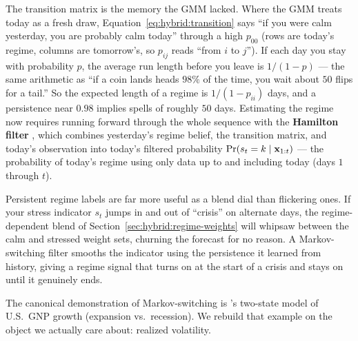 \begin{intuition}
The transition matrix is the memory the GMM lacked.  Where the GMM treats
today as a fresh draw, Equation~\eqref{eq:hybrid:transition} says ``if you
were calm yesterday, you are probably calm today'' through a high $p_{00}$
(rows are today's regime, columns are tomorrow's, so $p_{ij}$ reads ``from
$i$ to $j$'').  If each day you stay with probability $p$, the average run
length before you leave is $1/(1-p)$ --- the same arithmetic as ``if a coin
lands heads $98\%$ of the time, you wait about $50$ flips for a tail.''  So
the expected length of a regime is $1/(1-p_{ii})$ days, and a persistence
near $0.98$ implies spells of roughly $50$ days.  Estimating the
regime now requires running forward through the whole sequence with the
\textbf{Hamilton filter} \citep{Hamilton1989}, which combines yesterday's
regime belief, the transition matrix, and today's observation into
today's filtered probability $\Pr(s_t = k \mid \mathbf{x}_{1:t})$ --- the
probability of today's regime using only data up to and including today
(days $1$ through $t$).
\end{intuition}

\begin{projectconnection}
Persistent regime labels are far more useful as a blend dial than
flickering ones.  If your stress indicator $s_t$ jumps in and out of
``crisis'' on alternate days, the regime-dependent blend of
Section~\ref{sec:hybrid:regime-weights} will whipsaw between the calm and
stressed weight sets, churning the forecast for no reason.  A
Markov-switching filter smooths the indicator using the persistence it
learned from history, giving a regime signal that turns on at the start of
a crisis and stays on until it genuinely ends.
\end{projectconnection}

The canonical demonstration of Markov-switching is \citet{Hamilton1989}'s
two-state model of U.S.\ GNP growth (expansion vs.\ recession).  We rebuild
that example on the object we actually care about: realized volatility.

